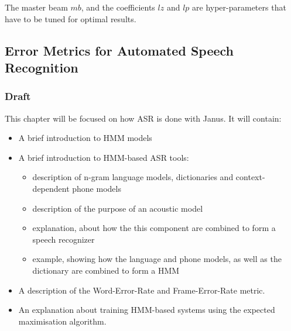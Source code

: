 The master beam $mb$, and the coefficients $lz$ and $lp$ are hyper-parameters that have to be tuned for optimal results. 

\subsection{Error Metrics for Automated Speech Recognition}

\subsubsection{Draft}

This chapter will be focused on how ASR is done with Janus. It will contain: 
\begin{itemize}
	\item A brief introduction to HMM models
	\item A brief introduction to HMM-based ASR tools:
	\begin{itemize}
		\item description of n-gram language models, dictionaries and context-dependent phone models
		\item description of the purpose of an acoustic model
		\item explanation, about how the this component are combined to form a speech recognizer 
		\item example, showing how the language and phone models, as well as the dictionary are combined to form a HMM
	\end{itemize}
	\item A description of the Word-Error-Rate and Frame-Error-Rate metric. 
	\item An explanation about training HMM-based systems using the expected maximisation algorithm. 
\end{itemize}

